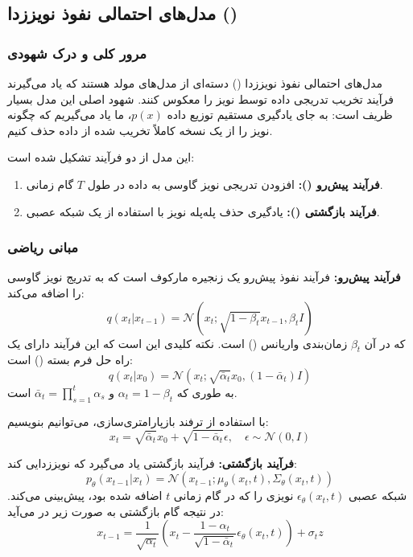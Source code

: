 \subsection{مدل‌های احتمالی نفوذ نویززدا ()}

\subsubsection{مرور کلی و درک شهودی}
مدل‌های احتمالی نفوذ نویززدا () دسته‌ای از مدل‌های مولد هستند که یاد می‌گیرند فرآیند تخریب تدریجی داده توسط نویز را معکوس کنند. شهود اصلی این مدل بسیار ظریف است: به جای یادگیری مستقیم توزیع داده $p(x)$، ما یاد می‌گیریم که چگونه نویز را از یک نسخه کاملاً تخریب شده از داده حذف کنیم.

این مدل از دو فرآیند تشکیل شده است:
\begin{enumerate}
    \item \textbf{فرآیند پیش‌رو ():} افزودن تدریجی نویز گاوسی به داده در طول $T$ گام زمانی.
    \item \textbf{فرآیند بازگشتی ():} یادگیری حذف پله‌پله نویز با استفاده از یک شبکه عصبی.
\end{enumerate}



\subsubsection{مبانی ریاضی}
\textbf{فرآیند پیش‌رو:} فرآیند نفوذ پیش‌رو یک زنجیره مارکوف است که به تدریج نویز گاوسی را اضافه می‌کند:
\[ q(x_t | x_{t-1}) = \mathcal{N}(x_t; \sqrt{1-\beta_t} x_{t-1}, \beta_t I) \]
که در آن $\beta_t$ زمان‌بندی واریانس () است. نکته کلیدی این است که این فرآیند دارای یک راه حل فرم بسته () است:
\[ q(x_t | x_0) = \mathcal{N}(x_t; \sqrt{\bar{\alpha}_t} x_0, (1-\bar{\alpha}_t) I) \]
به طوری که $\alpha_t = 1 - \beta_t$ و $\bar{\alpha}_t = \prod_{s=1}^t \alpha_s$ است.

با استفاده از ترفند بازپارامتری‌سازی، می‌توانیم بنویسیم:
\[ x_t = \sqrt{\bar{\alpha}_t} x_0 + \sqrt{1-\bar{\alpha}_t} \epsilon, \quad \epsilon \sim \mathcal{N}(0, I) \]

\textbf{فرآیند بازگشتی:} فرآیند بازگشتی یاد می‌گیرد که نویززدایی کند:
\[ p_\theta(x_{t-1} | x_t) = \mathcal{N}(x_{t-1}; \mu_\theta(x_t, t), \Sigma_\theta(x_t, t)) \]
شبکه عصبی $\epsilon_\theta(x_t, t)$ نویزی را که در گام زمانی $t$ اضافه شده بود، پیش‌بینی می‌کند. در نتیجه گام بازگشتی به صورت زیر در می‌آید:
\[ x_{t-1} = \frac{1}{\sqrt{\alpha_t}} \left( x_t - \frac{1-\alpha_t}{\sqrt{1-\bar{\alpha}_t}} \epsilon_\theta(x_t, t) \right) + \sigma_t z \]

